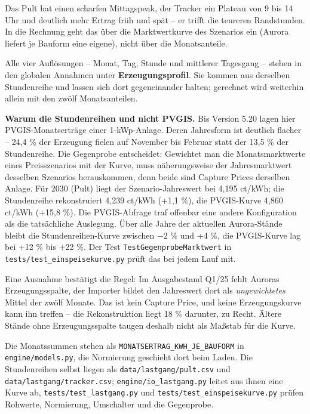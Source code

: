 \documentclass[
  a4paper,
  10pt]{article}
\begin{document}
Das Pult hat einen scharfen Mittagspeak, der Tracker ein Plateau von 9
bis 14 Uhr und deutlich mehr Ertrag früh und spät -- er trifft die
teureren Randstunden. In die Rechnung geht das über die Marktwertkurve
des Szenarios ein (Aurora liefert je Bauform eine eigene), nicht über
die Monatsanteile.

Alle vier Auflösungen -- Monat, Tag, Stunde und mittlerer Tagesgang --
stehen in den globalen Annahmen unter \textbf{Erzeugungsprofil}. Sie
kommen aus derselben Stundenreihe und lassen sich dort gegeneinander
halten; gerechnet wird weiterhin allein mit den zwölf Monatsanteilen.

\textbf{Warum die Stundenreihen und nicht PVGIS.} Bis Version 5.20 lagen
hier PVGIS-Monatserträge einer 1-kWp-Anlage. Deren Jahresform ist
deutlich flacher -- 24,4 \% der Erzeugung fielen auf November bis
Februar statt der 13,5 \% der Stundenreihe. Die Gegenprobe entscheidet:
Gewichtet man die Monatsmarktwerte eines Preisszenarios mit der Kurve,
muss näherungsweise der Jahresmarktwert desselben Szenarios
herauskommen, denn beide sind Capture Prices derselben Anlage. Für 2030
(Pult) liegt der Szenario-Jahreswert bei 4,195 ct/kWh; die Stundenreihe
rekonstruiert 4,239 ct/kWh (+1,1 \%), die PVGIS-Kurve 4,860 ct/kWh
(+15,8 \%). Die PVGIS-Abfrage traf offenbar eine andere Konfiguration
als die tatsächliche Auslegung. Über alle Jahre der aktuellen
Aurora-Stände bleibt die Stundenreihen-Kurve zwischen −2 \% und +4 \%,
die PVGIS-Kurve lag bei +12 \% bis +22 \%. Der Test
\texttt{TestGegenprobeMarktwert} in
\nolinkurl{tests/test_einspeisekurve.py} prüft das bei jedem Lauf mit.

Eine Ausnahme bestätigt die Regel: Im Ausgabestand Q1/25 fehlt Auroras
Erzeugungsspalte, der Importer bildet den Jahreswert dort als
\emph{ungewichtetes} Mittel der zwölf Monate. Das ist kein Capture
Price, und keine Erzeugungskurve kann ihn treffen -- die Rekonstruktion
liegt 18 \% darunter, zu Recht. Ältere Stände ohne Erzeugungsspalte
taugen deshalb nicht als Maßstab für die Kurve.

Die Monatssummen stehen als \texttt{MONATSERTRAG\_KWH\_JE\_BAUFORM} in
\nolinkurl{engine/models.py}, die Normierung geschieht dort beim Laden. Die
Stundenreihen selbst liegen als \nolinkurl{data/lastgang/pult.csv} und
\nolinkurl{data/lastgang/tracker.csv}; \nolinkurl{engine/io_lastgang.py}
leitet aus ihnen eine Kurve ab, \nolinkurl{tests/test_lastgang.py} und
\nolinkurl{tests/test_einspeisekurve.py} prüfen Rohwerte, Normierung,
Umschalter und die Gegenprobe.
\end{document}
